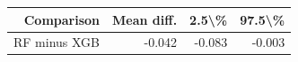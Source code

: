 \begin{tabular}{@{}rrrr@{}}
\toprule
Comparison & Mean diff. & 2.5\textbackslash \% & 97.5\textbackslash \% \\
\midrule
RF minus XGB & -0.042 & -0.083 & -0.003 \\
\bottomrule
\end{tabular}
